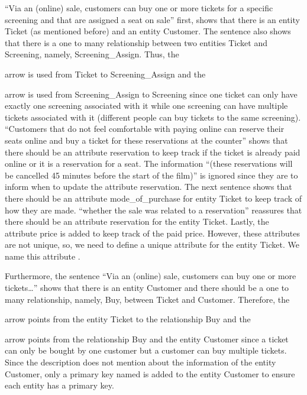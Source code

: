 \documentclass{article}
\newcommand{\key}[1]{\underline{\smash{#1}}}
\begin{document}
``Via an (online) sale, customers can buy one or more tickets for a specific
screening and that are assigned a seat on sale'' first, shows that there is an
entity Ticket (as mentioned before) and an entity Customer. The sentence also
shows that there is a one to many relationship between two entities Ticket and
Screening, namely, Screening\_Assign. Thus, the
arrow is used from Ticket to Screening\_Assign and the
arrow is used from Screening\_Assign to Screening since one ticket can only have
exactly one screening associated with it while one screening can have multiple
tickets associated with it (different people can buy tickets to the same screening).
``Customers that do not feel comfortable with paying online can reserve their
seats online and buy a ticket for these reservations at the counter'' shows that
there should be an attribute reservation to keep track if the ticket is already
paid online or it is a reservation for a seat. The information ``(these reservations
will be cancelled 45 minutes before the start of the film)'' is ignored since
they are to inform when to update the attribute reservation. The next sentence
shows that there should be an attribute mode\_of\_purchase for entity Ticket to
keep track of how they are made. ``whether the sale was related to a reservation''
reassures that there should be an  attribute reservation for the entity Ticket.
Lastly, the attribute price is added to keep track of the paid price. However,
these attributes are not unique, so, we need to define a unique attribute for the
entity Ticket. We name this attribute \key{ticket\_id}.

Furthermore, the sentence ``Via an (online) sale, customers can buy one or more
tickets\dots'' shows that there is an entity Customer and there should be a one
to many relationship, namely, Buy, between Ticket and Customer. Therefore, the
arrow points from the entity Ticket to the relationship Buy and the
arrow points from the relationship Buy and the entity Customer since a ticket can
only be bought by one customer but a customer can buy multiple tickets. Since
the description does not mention about the information of the entity Customer,
only a primary key named \key{customer\_id} is added to the entity Customer to
ensure each entity has a primary key.
\end{document}
